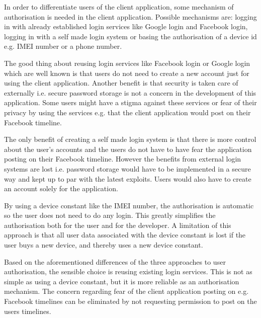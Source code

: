 In order to differentiate users of the client application, some mechanism of authorisation is needed in the client application. Possible mechanisms are: logging in with already established login services like Google login and Facebook login, logging in with a self made login system or basing the authorisation of a device id e.g. IMEI number or a phone number.

The good thing about reusing login services like Facebook login or Google login which are well known is that users do not need to create a new account just for using the client application. Another benefit is that security is taken care of externally i.e. secure password storage is not a concern in the development of this application. Some users might have a stigma against these services or fear of their privacy by using the services e.g. that the client application would post on their Facebook timeline.

The only benefit of creating a self made login system is that there is more control about the user's accounts and the users do not have to have fear the application posting on their Facebook timeline. However the benefits from external login systems are lost i.e. password storage would have to be implemented in a secure way and kept up to par with the latest exploits. Users would also have to create an account solely for the application.

By using a device constant like the IMEI number, the authorisation is automatic so the user does not need to do any login. This greatly simplifies the authorisation both for the user and for the developer. A limitation of this approach is that all user data associated with the device constant is lost if the user buys a new device, and thereby uses a new device constant.

Based on the aforementioned differences of the three approaches to user authorisation, the sensible choice is reusing existing login services. This is not as simple as using a device constant, but it is more reliable as an authorisation mechanism. The concern regarding fear of the client application posting on e.g. Facebook timelines can be eliminated by not requesting permission to post on the users timelines.